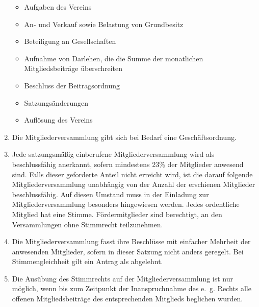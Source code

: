 \documentclass[a4paper,12pt]{scrartcl}
\begin{document}
\begin{enumerate}
    \begin{itemize}
      \item Aufgaben des Vereins
      \item An- und Verkauf sowie Belastung von Grundbesitz
      \item Beteiligung an Gesellschaften
      \item Aufnahme von Darlehen, die die Summe der monatlichen
        Mitgliedsbeiträge überschreiten
      \item Beschluss der Beitragsordnung
      \item Satzungsänderungen
      \item Auflösung des Vereins
    \end{itemize}
  \item Die Mitgliederversammlung gibt sich bei Bedarf eine Geschäftsordnung.
  \item Jede satzungsmäßig einberufene Mitgliederversammlung wird als
    beschlussfähig anerkannt, sofern mindestens 23\% der Mitglieder anwesend
    sind. Falls dieser geforderte Anteil nicht erreicht wird, ist die darauf
    folgende Mitgliederversammlung unabhängig von der Anzahl der erschienen
    Mitglieder beschlussfähig. Auf diesen Umstand muss in der Einladung zur
    Mitgliederversammlung besonders hingewiesen werden. Jedes ordentliche
    Mitglied hat eine Stimme. Fördermitglieder sind berechtigt, an den
    Versammlungen ohne Stimmrecht teilzunehmen.
  \item Die Mitgliederversammlung fasst ihre Beschlüsse mit einfacher Mehrheit
    der anwesenden Mitglieder, sofern in dieser Satzung nicht anders geregelt.
    Bei Stimmengleichheit gilt ein Antrag als abgelehnt.
  \item Die Ausübung des Stimmrechts auf der Mitgliederversammlung ist nur 
    möglich, wenn bis zum Zeitpunkt der Inanspruchnahme des e.~g. Rechts
    alle offenen Mitgliedsbeiträge des entsprechenden Mitglieds beglichen
    wurden.
\end{enumerate}
\end{document}
